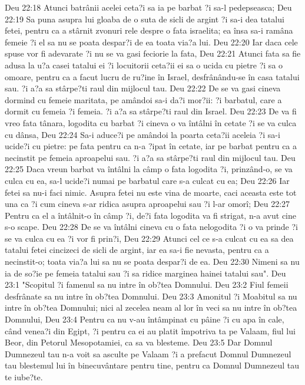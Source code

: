 Deu 22:18  Atunci batrânii acelei ceta?i sa ia pe barbat ?i sa-l pedepseasca;
Deu 22:19  Sa puna asupra lui gloaba de o suta de sicli de argint ?i sa-i dea tatalui fetei, pentru ca a stârnit zvonuri rele despre o fata israelita; ea însa sa-i ramâna femeie ?i el sa nu se poata despar?i de ea toata via?a lui.
Deu 22:20  Iar daca cele spuse vor fi adevarate ?i nu se va gasi feciorie la fata,
Deu 22:21  Atunci fata sa fie adusa la u?a casei tatalui ei ?i locuitorii ceta?ii ei sa o ucida cu pietre ?i sa o omoare, pentru ca a facut lucru de ru?ine în Israel, desfrânându-se în casa tatalui sau. ?i a?a sa stârpe?ti raul din mijlocul tau.
Deu 22:22  De se va gasi cineva dormind cu femeie maritata, pe amândoi sa-i da?i mor?ii: ?i barbatul, care a dormit cu femeia ?i femeia. ?i a?a sa stârpe?ti raul din Israel.
Deu 22:23  De va fi vreo fata tânara, logodita cu barbat ?i cineva o va întâlni în cetate ?i se va culca cu dânsa,
Deu 22:24  Sa-i aduce?i pe amândoi la poarta ceta?ii aceleia ?i sa-i ucide?i cu pietre: pe fata pentru ca n-a ?ipat în cetate, iar pe barbat pentru ca a necinstit pe femeia aproapelui sau. ?i a?a sa stârpe?ti raul din mijlocul tau.
Deu 22:25  Daca vreun barbat va întâlni la câmp o fata logodita ?i, prinzând-o, se va culca cu ea, sa-l ucide?i numai pe barbatul care s-a culcat cu ea;
Deu 22:26  Iar fetei sa nu-i faci nimic. Asupra fetei nu este vina de moarte, caci aceasta este tot una ca ?i cum cineva s-ar ridica asupra aproapelui sau ?i l-ar omorî;
Deu 22:27  Pentru ca el a întâlnit-o în câmp ?i, de?i fata logodita va fi strigat, n-a avut cine s-o scape.
Deu 22:28  De se va întâlni cineva cu o fata nelogodita ?i o va prinde ?i se va culca cu ea ?i vor fi prin?i,
Deu 22:29  Atunci cel ce s-a culcat cu ea sa dea tatalui fetei cincizeci de sicli de argint, iar ea sa-i fie nevasta, pentru ca a necinstit-o; toata via?a lui sa nu se poata despar?i de ea.
Deu 22:30  Nimeni sa nu ia de so?ie pe femeia tatalui sau ?i sa ridice marginea hainei tatalui sau".
Deu 23:1  "Scopitul ?i famenul sa nu intre în ob?tea Domnului.
Deu 23:2  Fiul femeii desfrânate sa nu intre în ob?tea Domnului.
Deu 23:3  Amonitul ?i Moabitul sa nu intre în ob?tea Domnului; nici al zecelea neam al lor în veci sa nu intre în ob?tea Domnului,
Deu 23:4  Pentru ca nu v-au întâmpinat cu pâine ?i cu apa în cale, când venea?i din Egipt, ?i pentru ca ei au platit împotriva ta pe Valaam, fiul lui Beor, din Petorul Mesopotamiei, ca sa va blesteme.
Deu 23:5  Dar Domnul Dumnezeul tau n-a voit sa asculte pe Valaam ?i a prefacut Domnul Dumnezeul tau blestemul lui în binecuvântare pentru tine, pentru ca Domnul Dumnezeul tau te iube?te.
